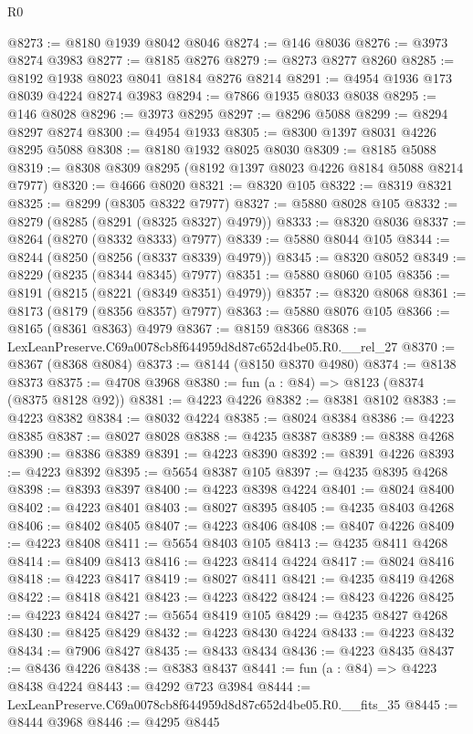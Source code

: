 \begin{lexlean}{R0}
\begin{coremodule}
@8273 := @8180 @1939 @8042 @8046
@8274 := @146 @8036
@8276 := @3973 @8274 @3983
@8277 := @8185 @8276
@8279 := @8273 @8277 @8260
@8285 := @8192 @1938 @8023 @8041 @8184 @8276 @8214
@8291 := @4954 @1936 @173 @8039 @4224 @8274 @3983
@8294 := @7866 @1935 @8033 @8038
@8295 := @146 @8028
@8296 := @3973 @8295
@8297 := @8296 @5088
@8299 := @8294 @8297 @8274
@8300 := @4954 @1933
@8305 := @8300 @1397 @8031 @4226 @8295 @5088
@8308 := @8180 @1932 @8025 @8030
@8309 := @8185 @5088
@8319 := @8308 @8309 @8295 (@8192 @1397 @8023 @4226 @8184 @5088 @8214 @7977)
@8320 := @4666 @8020
@8321 := @8320 @105
@8322 := @8319 @8321
@8325 := @8299 (@8305 @8322 @7977)
@8327 := @5880 @8028 @105
@8332 := @8279 (@8285 (@8291 (@8325 @8327) @4979))
@8333 := @8320 @8036
@8337 := @8264 (@8270 (@8332 @8333) @7977)
@8339 := @5880 @8044 @105
@8344 := @8244 (@8250 (@8256 (@8337 @8339) @4979))
@8345 := @8320 @8052
@8349 := @8229 (@8235 (@8344 @8345) @7977)
@8351 := @5880 @8060 @105
@8356 := @8191 (@8215 (@8221 (@8349 @8351) @4979))
@8357 := @8320 @8068
@8361 := @8173 (@8179 (@8356 @8357) @7977)
@8363 := @5880 @8076 @105
@8366 := @8165 (@8361 @8363) @4979
@8367 := @8159 @8366
@8368 := LexLeanPreserve.C69a0078cb8f644959d8d87c652d4be05.R0.__rel_27
@8370 := @8367 (@8368 @8084)
@8373 := @8144 (@8150 @8370 @4980)
@8374 := @8138 @8373
@8375 := @4708 @3968
@8380 := fun (a : @84) => @8123 (@8374 (@8375 @8128 @92))
@8381 := @4223 @4226
@8382 := @8381 @8102
@8383 := @4223 @8382
@8384 := @8032 @4224
@8385 := @8024 @8384
@8386 := @4223 @8385
@8387 := @8027 @8028
@8388 := @4235 @8387
@8389 := @8388 @4268
@8390 := @8386 @8389
@8391 := @4223 @8390
@8392 := @8391 @4226
@8393 := @4223 @8392
@8395 := @5654 @8387 @105
@8397 := @4235 @8395 @4268
@8398 := @8393 @8397
@8400 := @4223 @8398 @4224
@8401 := @8024 @8400
@8402 := @4223 @8401
@8403 := @8027 @8395
@8405 := @4235 @8403 @4268
@8406 := @8402 @8405
@8407 := @4223 @8406
@8408 := @8407 @4226
@8409 := @4223 @8408
@8411 := @5654 @8403 @105
@8413 := @4235 @8411 @4268
@8414 := @8409 @8413
@8416 := @4223 @8414 @4224
@8417 := @8024 @8416
@8418 := @4223 @8417
@8419 := @8027 @8411
@8421 := @4235 @8419 @4268
@8422 := @8418 @8421
@8423 := @4223 @8422
@8424 := @8423 @4226
@8425 := @4223 @8424
@8427 := @5654 @8419 @105
@8429 := @4235 @8427 @4268
@8430 := @8425 @8429
@8432 := @4223 @8430 @4224
@8433 := @4223 @8432
@8434 := @7906 @8427
@8435 := @8433 @8434
@8436 := @4223 @8435
@8437 := @8436 @4226
@8438 := @8383 @8437
@8441 := fun (a : @84) => @4223 @8438 @4224
@8443 := @4292 @723 @3984
@8444 := LexLeanPreserve.C69a0078cb8f644959d8d87c652d4be05.R0.__fits_35
@8445 := @8444 @3968
@8446 := @4295 @8445

\end{coremodule}
\end{lexlean}
